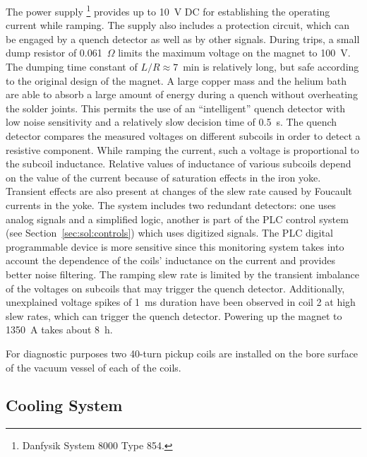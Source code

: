 The power supply%
\footnote{Danfysik System 8000 Type 854.}
provides up to 10~V DC for establishing the operating current while ramping. The supply also
includes a protection circuit, which can be engaged by a quench
detector as well as by other signals. During trips, a small dump resistor
of 0.061~$\Omega$ limits the maximum voltage on the magnet to 100~V. The dumping time constant of $L/R \approx 7$~min is
relatively long, but safe according to the original design of the
magnet. A large copper mass and the helium bath are able to absorb a
large amount of energy during a quench without overheating the solder
joints. This permits the use of an ``intelligent''  quench detector with low noise sensitivity and a relatively slow decision time of 0.5~s. The quench detector compares the measured voltages on different subcoils
in order to detect a resistive component.
While ramping the current, such a voltage is proportional
to the subcoil inductance.  Relative values of inductance of various
subcoils depend on the value of the current because of saturation
effects in the iron yoke. Transient effects are also present at changes
of the slew rate caused by Foucault currents in the yoke.
The system includes two redundant detectors: one uses analog signals
and a simplified logic, another is part of the PLC control system (see
Section~\ref{sec:sol:controls}) which uses digitized signals. The PLC
digital programmable device is more sensitive since this monitoring system takes into
account the dependence of the coils' inductance on the current and
provides better noise filtering.  The ramping slew rate is
limited by the transient imbalance of the voltages on subcoils that
may trigger the quench detector. Additionally,
unexplained voltage spikes of 1~ms duration
have been observed in coil 2 at high
slew rates, which can  trigger the quench detector. Powering up the
magnet to 1350~A takes about 8~h.

For diagnostic purposes two 40-turn pickup coils are installed on the bore
surface of the vacuum vessel of each of the coils. 

\subsection[Cooling System]{
   Cooling System
   \label{sec:sol:cryo}
}

